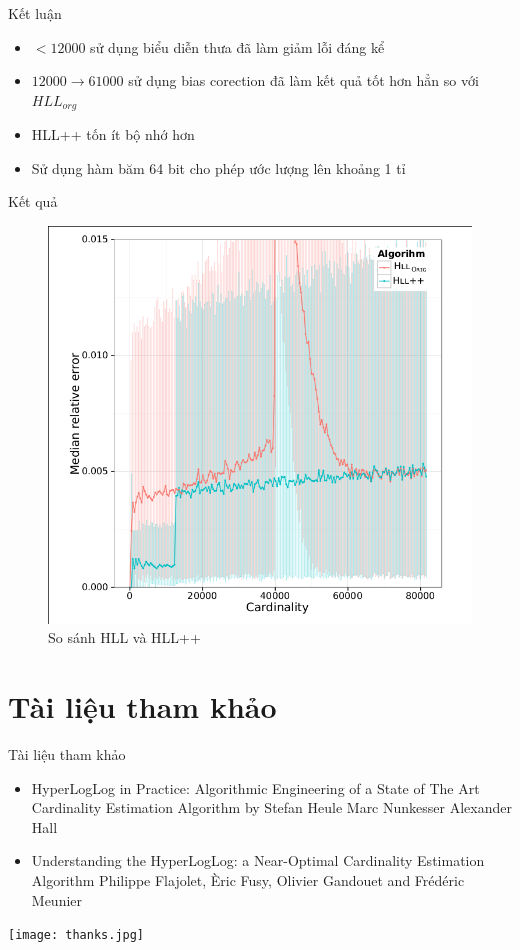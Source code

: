 \documentclass{beamer}
\newcommand{\bi}{\begin{itemize}}
\newcommand{\ei}{\end{itemize}}
\begin{document}
\begin{frame}{Kết luận}
\begin{itemize}
\item $<12000$ sử dụng biểu diễn thưa đã làm giảm lỗi đáng kể
\item $12000\rightarrow61000$ sử dụng bias corection đã làm kết quả tốt hơn hẳn so với $HLL_{org}$
\item HLL++ tốn ít bộ nhớ hơn
\item Sử dụng hàm băm 64 bit cho phép ước lượng lên khoảng 1 tỉ
\end{itemize}

\end{frame}
\begin{frame}{Kết quả }
\begin{figure}[H]
\includegraphics[scale=0.3]{KL.png}
\caption{ So sánh HLL và HLL++}
\end{figure}
\end{frame}
\section*{Tài liệu tham khảo}

\begin{frame}{Tài liệu tham khảo}
    \vspace{20pt}

    \bi
        \item HyperLogLog in Practice: Algorithmic Engineering of a
State of The Art Cardinality Estimation Algorithm by Stefan Heule Marc Nunkesser Alexander Hall
        \item Understanding the HyperLogLog: a
Near-Optimal Cardinality Estimation Algorithm
Philippe Flajolet, Èric Fusy, Olivier Gandouet and Frédéric Meunier
    \ei
\end{frame}

\begin{frame}
\texttt{[image: thanks.jpg]}
\end{frame}
\end{document}
